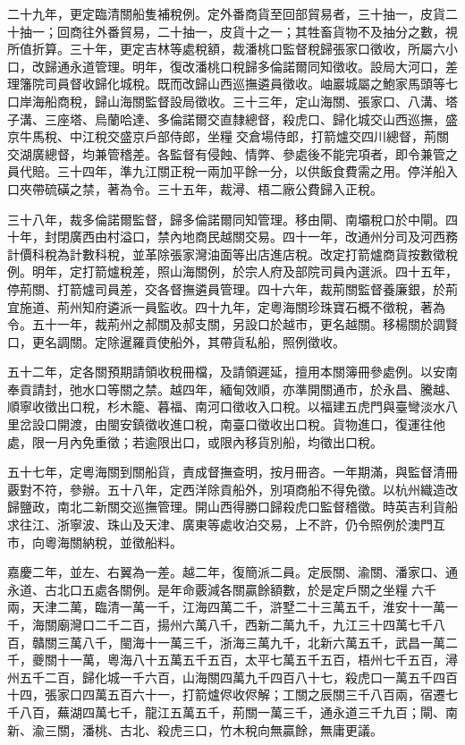 \begin{pinyinscope}
二十九年，更定臨清關船隻補稅例。定外番商貨至回部貿易者，三十抽一，皮貨二十抽一；回商往外番貿易，二十抽一，皮貨十之一；其牲畜貨物不及抽分之數，視所值折算。三十年，更定吉林等處稅額，裁潘桃口監督稅歸張家口徵收，所屬六小口，改歸通永道管理。明年，復改潘桃口稅歸多倫諾爾同知徵收。設局大河口，差理籓院司員督收歸化城稅。既而改歸山西巡撫遴員徵收。岫巖城屬之鮑家馬頭等七口岸海船商稅，歸山海關監督設局徵收。三十三年，定山海關、張家口、八溝、塔子溝、三座塔、烏蘭哈達、多倫諾爾交直隸總督，殺虎口、歸化城交山西巡撫，盛京牛馬稅、中江稅交盛京戶部侍郎，坐糧交倉場侍郎，打箭爐交四川總督，荊關交湖廣總督，均兼管稽差。各監督有侵蝕、情弊、參處後不能完項者，即令兼管之員代賠。三十四年，準九江關正稅一兩加平餘一分，以供飯食費需之用。停洋船入口夾帶硫磺之禁，著為令。三十五年，裁潯、梧二廠公費歸入正稅。

三十八年，裁多倫諾爾監督，歸多倫諾爾同知管理。移由閘、南壩稅口於中閘。四十年，封閉廣西由村溢口，禁內地商民越關交易。四十一年，改通州分司及河西務計價科稅為計數科稅，並革除張家灣油面等出店進店稅。改定打箭爐商貨按數徵稅例。明年，定打箭爐稅差，照山海關例，於宗人府及部院司員內選派。四十五年，停荊關、打箭爐司員差，交各督撫遴員管理。四十六年，裁荊關監督養廉銀，於荊宜施道、荊州知府遴派一員監收。四十九年，定粵海關珍珠寶石概不徵稅，著為令。五十一年，裁荊州之郝關及郝支關，另設口於越市，更名越關。移楊關於調賢口，更名調關。定除暹羅貢使船外，其帶貨私船，照例徵收。

五十二年，定各關預期請領收稅冊檔，及請領遲延，擅用本關簿冊參處例。以安南奉貢請封，弛水口等關之禁。越四年，緬甸效順，亦準開關通市，於永昌、騰越、順寧收徵出口稅，杉木籠、暮福、南河口徵收入口稅。以福建五虎門與臺彎淡水八里岔設口開渡，由閩安鎮徵收進口稅，南臺口徵收出口稅。貨物進口，復運往他處，限一月內免重徵；若逾限出口，或限內移貨別船，均徵出口稅。

五十七年，定粵海關到關船貨，責成督撫查明，按月冊咨。一年期滿，與監督清冊覈對不符，參辦。五十八年，定西洋除貢船外，別項商船不得免徵。以杭州織造改歸鹽政，南北二新關交巡撫管理。開山西得勝口歸殺虎口監督稽徵。時英吉利貨船求往江、浙寧波、珠山及天津、廣東等處收泊交易，上不許，仍令照例於澳門互市，向粵海關納稅，並徵船料。

嘉慶二年，並左、右翼為一差。越二年，復簡派二員。定辰關、渝關、潘家口、通永道、古北口五處各關例。是年命覈減各關贏餘額數，於是定戶關之坐糧六千兩，天津二萬，臨清一萬一千，江海四萬二千，滸墅二十三萬五千，淮安十一萬一千，海關廟灣口二千二百，揚州六萬八千，西新二萬九千，九江三十四萬七千八百，贛關三萬八千，閩海十一萬三千，浙海三萬九千，北新六萬五千，武昌一萬二千，夔關十一萬，粵海八十五萬五千五百，太平七萬五千五百，梧州七千五百，潯州五千二百，歸化城一千六百，山海關四萬九千四百八十七，殺虎口一萬五千四百十四，張家口四萬五百六十一，打箭爐侭收侭解；工關之辰關三千八百兩，宿遷七千八百，蕪湖四萬七千，龍江五萬五千，荊關一萬三千，通永道三千九百；閘、南新、渝三關，潘桃、古北、殺虎三口，竹木稅向無贏餘，無庸更議。


\end{pinyinscope}
